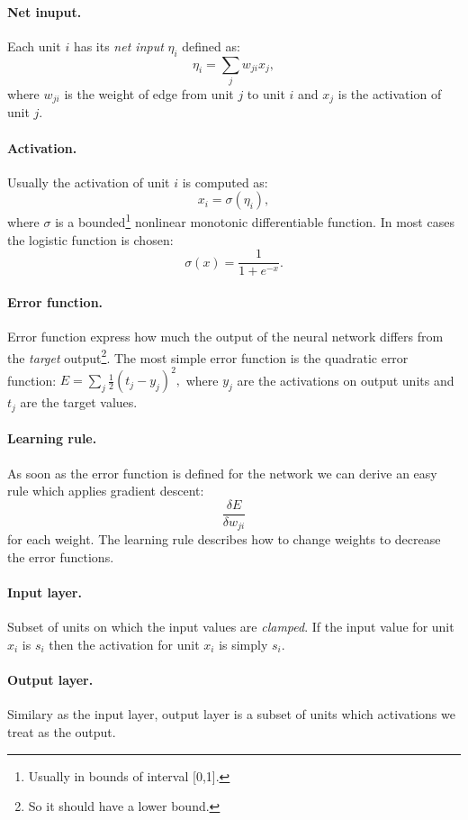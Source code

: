 \paragraph{Net inuput.}
Each unit $i$ has its \emph{net input} $\eta_i$ defined as:
$$\eta_i = \sum_j w_{ji}x_j,$$
where $w_{ji}$ is the weight of edge from unit $j$ to unit $i$ and $x_j$ is the activation of unit $j$.

\paragraph{Activation.}
Usually the activation of unit $i$ is computed as:
$$x_i = \sigma(\eta_i),$$
where $\sigma$ is a bounded\footnote{
Usually in bounds of interval [0,1].
} nonlinear monotonic differentiable function. In most cases the logistic function is chosen:
$$\sigma(x) = \frac{1}{1 + e^{-x}}.$$

\paragraph{Error function.}
Error function express how much the output of the neural network differs from the \emph{target} output\footnote{
So it should have a lower bound. 
}. The most simple error function is the quadratic error function:
$E = \sum_j \frac{1}{2}(t_j-y_j)^2,$
where $y_j$ are the activations on output units and $t_j$ are the target values.

\paragraph{Learning rule.}
As soon as the error function is defined for the network we can derive an easy rule which applies gradient descent: 
$$\frac{\delta E}{\delta w_{ji}}$$
for each weight. The learning rule describes how to change weights to decrease the error functions.

\paragraph{Input layer.}
Subset of units on which the input values are \emph{clamped}. If the input value for unit $x_i$ is $s_i$ then the activation for unit $x_i$ is simply $s_i$. 

\paragraph{Output layer.}
Similary as the input layer, output layer is a subset of units which activations we treat as the output. 

